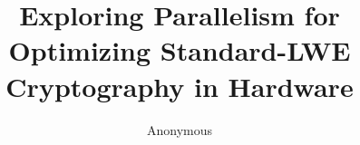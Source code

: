 \documentclass[twocolumn]{svjour3}
\makeatletter
\newcommand{\mailtodomain}[1]{\href{mailto:#1@bristol.ac.uk}{\nolinkurl{#1}}}
\makeatother
\begin{document}
\title{Exploring Parallelism for Optimizing Standard-LWE Cryptography in Hardware} 
%


\author{%
Anonymous
}

\maketitle






 


\end{document}
